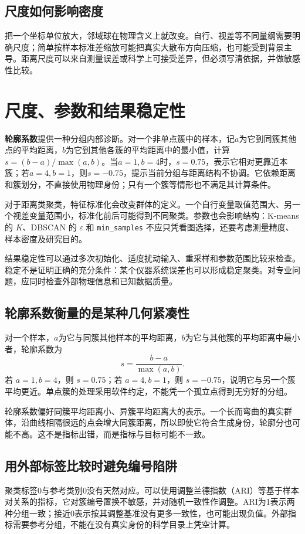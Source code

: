 \subsection{尺度如何影响密度}
把一个坐标单位放大，邻域球在物理含义上就改变。自行、视差等不同量纲需要明确尺度；简单按样本标准差缩放可能把真实大散布方向压缩，也可能受到背景主导。距离尺度可以来自测量误差或科学上可接受差异，但必须写清依据，并做敏感性比较。

\section{尺度、参数和结果稳定性}

\textbf{轮廓系数}提供一种分组内部诊断。对一个非单点簇中的样本，记$a$为它到同簇其他点的平均距离，$b$为它到其他各簇的平均距离中的最小值，计算$s=(b-a)/\max(a,b)$。当$a=1,b=4$时，$s=0.75$，表示它相对更靠近本簇；若$a=4,b=1$，则$s=-0.75$，提示当前分组与距离结构不协调。它依赖距离和簇划分，不直接使用物理身份；只有一个簇等情形也不满足其计算条件。

对于距离类聚类，特征标准化会改变群体的定义。一个自行变量取值范围大、另一个视差变量范围小，标准化前后可能得到不同聚类。参数也会影响结构：K-means 的 $K$、DBSCAN 的 $\varepsilon$ 和 \texttt{min\_samples} 不应只凭看图选择，还要考虑测量精度、样本密度及研究目的。

结果稳定性可以通过多次初始化、适度扰动输入、重采样和参数范围比较来检查。稳定不是证明正确的充分条件：某个仪器系统误差也可以形成稳定聚类。对专业问题，应同时检查外部物理信息和已知数据质量。

\subsection{轮廓系数衡量的是某种几何紧凑性}
对一个样本，$a$为它与同簇其他样本的平均距离，$b$为它与其他簇的平均距离中最小者，轮廓系数为
\[
s=\frac{b-a}{\max(a,b)}.
\]
若 $a=1,b=4$，则 $s=0.75$；若 $a=4,b=1$，则 $s=-0.75$，说明它与另一个簇平均更近。单点簇的处理采用软件约定，不能凭一个孤立点得到无穷好的分组。

轮廓系数偏好同簇平均距离小、异簇平均距离大的表示。一个长而弯曲的真实群体，沿曲线相隔很远的点会增大同簇距离，所以即使它符合生成身份，轮廓分也可能不高。这不是指标出错，而是指标与目标可能不一致。

\subsection{用外部标签比较时避免编号陷阱}
聚类标签0与参考类别0没有天然对应。可以使用调整兰德指数（ARI）等基于样本对关系的指标，它对簇编号置换不敏感，并对随机一致性作调整。ARI为1表示两种分组一致；接近0表示按其调整基准没有更多一致性，也可能出现负值。外部指标需要参考分组，不能在没有真实身份的科学目录上凭空计算。

